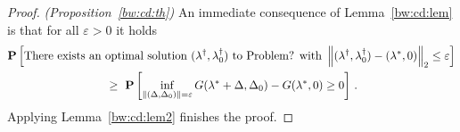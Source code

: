 \begin{proof}
  \emph{(Proposition~\ref{bw:cd:th})}
An immediate consequence of Lemma~\ref{bw:cd:lem} is
that for all $\varepsilon>0$ it holds
\begin{gather*}
   \P
   \left[ 
     \text{There exists an optimal solution $(\lambda^\dagger,\lambda_0^\dagger)$ to Problem? with}
     \ 
     \norm
     {
       (\lambda^\dagger,\lambda_0^\dagger)
      -
      (\lambda^*,0)
     }_2
     \le
     \varepsilon
   \right]
   \\
   \
   \ge
   \ 
   \P
   \left[ 
     \inf _ { 
       \norm{
         (
     \Delta
     ,
     \Delta_0
         )
 } 
= \varepsilon }
     G
     (
     \lambda^*
      +
      \Delta
      ,
     \Delta_0
     )
     -
     G
     (
     \lambda^*,
     0
     )
     \ge 
     0
   \right]
   \,.
 \end{gather*}
 Applying Lemma~\ref{bw:cd:lem2} finishes the proof.
\end{proof}

